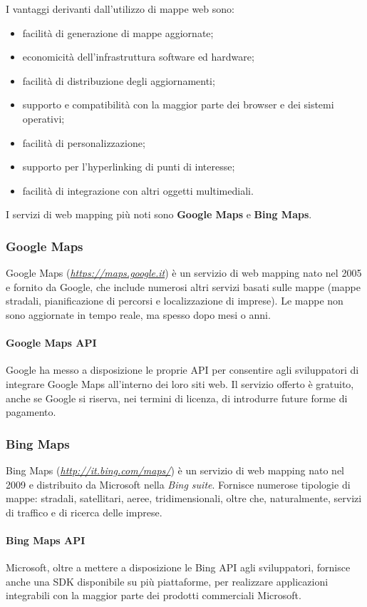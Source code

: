 I vantaggi derivanti dall'utilizzo di mappe web sono:
\begin{itemize}
\item facilità di generazione di mappe aggiornate;
\item economicità dell'infrastruttura software ed hardware;
\item facilità di distribuzione degli aggiornamenti;
\item supporto e compatibilità con la maggior parte dei browser e dei sistemi operativi;
\item facilità di personalizzazione;
\item supporto per l'hyperlinking di punti di interesse;
\item facilità di integrazione con altri oggetti multimediali.
\end{itemize}

I servizi di web mapping più noti sono \textbf{Google Maps} e \textbf{Bing Maps}.
\subsubsection{Google Maps}
Google Maps (\emph{\url{https://maps.google.it}}) è un servizio di web mapping nato nel 2005 e fornito da Google, che include numerosi altri servizi basati sulle mappe (mappe stradali, pianificazione di percorsi e localizzazione di imprese).
Le mappe non sono aggiornate in tempo reale, ma spesso dopo mesi o anni.
\paragraph{Google Maps API}
Google ha messo a disposizione le proprie API per consentire agli sviluppatori di integrare Google Maps all'interno dei loro siti web.
Il servizio offerto è gratuito, anche se Google si riserva, nei termini di licenza, di introdurre future forme di pagamento.

\subsubsection{Bing Maps}
Bing Maps (\emph{\url{http://it.bing.com/maps/}}) è un servizio di web mapping nato nel 2009 e distribuito da Microsoft nella \textit{Bing suite}.
Fornisce numerose tipologie di mappe: stradali, satellitari, aeree, tridimensionali, oltre che, naturalmente, servizi di traffico e di ricerca delle imprese.
\paragraph{Bing Maps API}
Microsoft, oltre a mettere a disposizione le Bing API agli sviluppatori, fornisce anche una SDK disponibile su più piattaforme, per realizzare applicazioni integrabili con la maggior parte dei prodotti commerciali Microsoft.

